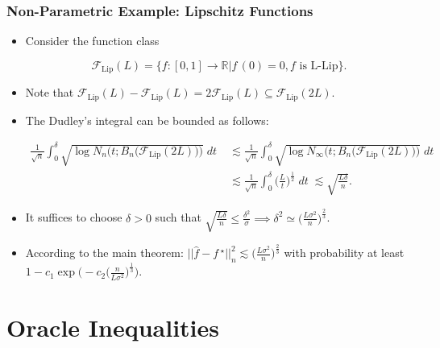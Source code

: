 \documentclass[11pt]{beamer}
\newcommand{\cF}{\mathcal{F}}
\newcommand{\fstar}{f\,^\star}
\newcommand{\fhat}{\widehat{f}}
\begin{document}
	\begin{frame}
		\frametitle{Non-Parametric Example: Lipschitz Functions}
		\begin{itemize}			
			\item Consider the function class 
			\begin{small}
				\begin{equation*}
					\cF_{\mathrm{Lip}}(L) = \{f:[0, 1] \to \mathbb{R} \big| f\,(0) = 0, f \text{ is L-Lip} \}.
				\end{equation*}			
			\end{small}
			\item Note that $\cF_{\mathrm{Lip}}(L) - \cF_{\mathrm{Lip}}(L) = 2 \cF_{\mathrm{Lip}}(L) \subseteq \cF_{\mathrm{Lip}}(2L)$.
			\item The Dudley's integral can be bounded as follows:
			\begin{small}
			\begin{align*}
				\frac{1}{\sqrt{n}}\int_{0}^{\delta}\sqrt{\log N_n\Big(t; B_n\big(\cF_{\mathrm{Lip}}(2L)\big)\Big)} \; dt\; &\lesssim\frac{1}{\sqrt{n}} \int_{0}^{\delta}\sqrt{\log N_\infty\Big(t; B_n\big(\cF_{\mathrm{Lip}}(2L)\big)\Big)} \; dt\\
				&\lesssim \frac{1}{\sqrt{n}}\int_{0}^{\delta} \Big(\frac{L}{t}\Big)^{\frac{1}{2}} \; dt \; \lesssim \sqrt{\frac{L\delta}{n}}.
			\end{align*}
			\end{small}	
			\item It suffices to choose $\delta>0$ such that $\sqrt{\frac{L\delta}{n}} \leq \frac{\delta^2}{\sigma} \implies \delta^2 \simeq \Big(\frac{L\sigma^2}{n}\Big)^{\frac{2}{3}}$.
			\item According to the main theorem: $||\fhat - \fstar||_n^2 \lesssim \Big(\frac{L\sigma^2}{n}\Big)^{\frac{2}{3}}$ with  probability at least $1 - c_1\exp\big(-c_2\big(\frac{n}{L\sigma^2}\big)^{\frac{1}{3}}\big)$.
		\end{itemize}
	\end{frame}

	\section{Oracle Inequalities}
	\frame{\sectionpage}
	
\end{document}
